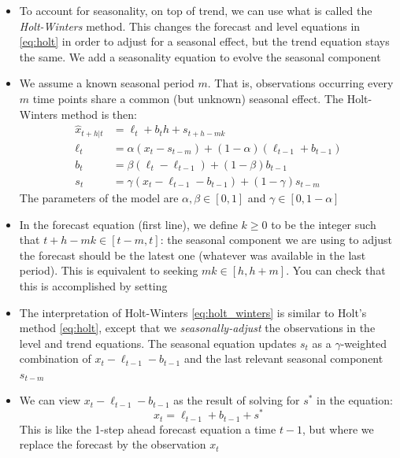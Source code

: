 \documentclass{article}
\begin{document}
\begin{itemize}
\item To account for seasonality, on top of trend, we can use what is called the   
  \emph{Holt-Winters} method. This changes the forecast and level equations in
  \eqref{eq:holt} in order to adjust for a seasonal effect, but the trend
  equation stays the same. We add a seasonality equation to evolve the seasonal
  component    

\item We assume a known seasonal period $m$. That is, observations occurring
  every $m$ time points share a common (but unknown) seasonal effect. The
  Holt-Winters method is then:  
  \begin{equation}
  \label{eq:holt_winters}
  \begin{aligned}
  \hat{x}_{t+h | t} &= \ell_t + b_t h + s_{t+h-mk} \\  
  \ell_t &= \alpha (x_t - s_{t-m}) + (1-\alpha) (\ell_{t-1} + b_{t-1}) \\ 
  b_t &= \beta (\ell_t - \ell_{t-1}) + (1-\beta) b_{t-1} \\
  s_t &= \gamma (x_t - \ell_{t-1} - b_{t-1}) + (1-\gamma) s_{t-m} 
  \end{aligned}
  \end{equation}
  The parameters of the model are $\alpha, \beta \in [0,1]$ and $\gamma \in [0,
  1-\alpha]$ 

\item In the forecast equation (first line), we define $k \geq 0$ to be the
  integer such that $t+h-mk \in [t-m, t]$: the seasonal component we are using
  to adjust the forecast should be the latest one (whatever was available in the
  last period). This is equivalent to seeking $mk \in [h, h+m]$. You can check
  that this is accomplished by setting  

\item The interpretation of Holt-Winters \eqref{eq:holt_winters} is similar to 
  Holt's method \eqref{eq:holt}, except that we \emph{seasonally-adjust} the 
  observations in the level and trend equations. The seasonal equation updates
  $s_t$ as a $\gamma$-weighted combination of $x_t - \ell_{t-1} -  b_{t-1}$ and
  the last relevant seasonal component $s_{t-m}$ 

\item We can view $x_t - \ell_{t-1} -  b_{t-1}$ as the result of solving for $s^*$
  in the equation:    
  \[
  x_t = \ell_{t-1} + b_{t-1} + s^*
  \]
  This is like the 1-step ahead forecast equation a time $t-1$, but where we
  replace the forecast  by the observation $x_t$ 


\end{itemize}
\end{document}
